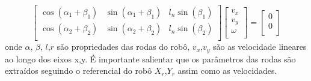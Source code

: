 \[
\begin{bmatrix}
    \cos(\alpha_{1} + \beta_{1}) &  \sin(\alpha_{1} + \beta_{1}) &  l_n\sin(\beta_{1}) \\
    \cos(\alpha_{2} + \beta_{2}) &  \sin(\alpha_{2} + \beta_{2})  &  l_n\sin(\beta_{2})\\
\end{bmatrix}
\begin{bmatrix}
    v_x \\
    v_y \\
    \omega\\
\end{bmatrix}
=
\begin{bmatrix}
    0 \\
    0 \\
\end{bmatrix}
\]
onde $\alpha$, $\beta$, $l$,$r$ são propriedades das rodas do robô,
$v_x$,$v_y$ são as velocidade lineares ao longo dos eixos x,y.
É importante salientar que os parâmetros das
rodas são extraídos seguindo o referencial do robô $X_r$,$Y_r$ assim como
as velocidades.
